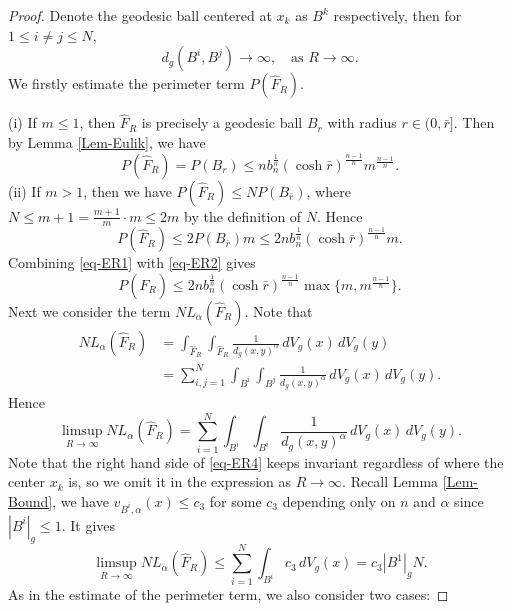 \documentclass[11pt,reqno]{amsart}
\theoremstyle{definition}
\theoremstyle{remark}
\numberwithin{equation}{section}
\renewcommand{\(}{\left(}
\renewcommand{\)}{\right)}
\renewcommand{\-}{\overline}
\begin{document}
\begin{proof}
	Denote the geodesic ball centered at $x_k$ as $B^k$ respectively, then for $1\leq i\neq j\leq N$,
	\begin{equation}
		d_g(B^i, B^j)\to\infty, \quad \text{as $R\to\infty$}.
	\end{equation}
	We firstly estimate the perimeter term $P(\widehat{F}_R)$. 
	
	\noindent(i) If $m\leq 1$, then $\widehat{F}_R$ is precisely a geodesic ball $B_r$ with radius $r\in(0,\bar{r}]$. Then by Lemma \ref{Lem-Eulik}, we have 
	\begin{equation}\label{eq-ER1}
		P(\widehat{F}_R)=P(B_r)\leq n b_n^{\frac{1}{n}}(\cosh\bar{r})^{\frac{n-1}{n}}m^{\frac{n-1}{n}}.
	\end{equation}
   (ii) If $m>1$, then we have $P(\widehat{F}_R)\leq N P(B_{\bar{r}})$,
   where $N\leq m+1=\frac{m+1}{m}\cdot m\leq 2m$ by the definition of $N$. Hence
   \begin{equation}\label{eq-ER2}
   	P(\widehat{F}_R)\leq 2P(B_{\bar{r}}) m\leq 2n b_n^{\frac{1}{n}}(\cosh\bar{r})^{\frac{n-1}{n}} m.
   	\end{equation}
   	Combining \eqref{eq-ER1} with \eqref{eq-ER2} gives
   	\begin{equation}\label{eq-ER3}
   		P(\widehat{F}_R)\leq  2n b_n^{\frac{1}{n}}(\cosh\bar{r})^{\frac{n-1}{n}}\max\{m,m^{\frac{n-1}{n}}\}.
   	\end{equation} 
   	Next we consider the term $NL_{\alpha}(\widehat{F}_R)$. Note that
   	\begin{align*}
   		NL_{\alpha}(\widehat{F}_R)&=\int_{\widehat{F}_R}\int_{\widehat{F}_R}\frac{1}{d_g(x,y)^{\alpha}}\,dV_g(x)\,dV_g(y)\\
   		&=\sum_{i,j=1}^N\int_{B^i}\int_{B^j}\frac{1}{d_g(x,y)^{\alpha}}\,dV_g(x)\,dV_g(y).
   \end{align*}
   Hence 
   \begin{equation}\label{eq-ER4}
   \limsup_{R\to\infty}NL_{\alpha}(\widehat{F}_R)=\sum_{i=1}^N\int_{B^i}\int_{B^i}\frac{1}{d_g(x,y)^{\alpha}}\,dV_g(x)\,dV_g(y).
   \end{equation}
  Note that the right hand side of \eqref{eq-ER4} keeps invariant regardless of where the center $x_k$ is, so we omit it in the expression as $R\to\infty$. Recall Lemma \ref{Lem-Bound}, we have $	v_{B^i,\alpha}(x)\leq c_3$ for some $c_3$ depending only on $n$ and $\alpha$ since $|B^i|_g\leq 1$. It gives
  \begin{equation}\label{eqER6}
  	\limsup_{R\to\infty}NL_{\alpha}(\widehat{F}_R)\leq \sum_{i=1}^N\int_{B^i}c_3\,dV_g(x)=c_3|B^1|_g N.
  \end{equation}
 As in the estimate of the perimeter term, we also consider two cases:
 

\end{proof}
\end{document}
